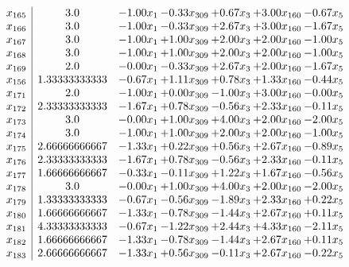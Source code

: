 \documentclass[8pt]{article}
\begin{document}
\[\begin{array}{c| c c@{\hskip 2pt} c@{\hskip 2pt} c@{\hskip 2pt} c@{\hskip 2pt} c@{\hskip 2pt} }
 x_{165}   &  3.0 & -1.00 x_{1} & -0.33 x_{309} & +  0.67 x_{3} & +  3.00 x_{160} & -0.67 x_{5}\\
 x_{166}   &  3.0 & -1.00 x_{1} & -0.33 x_{309} & +  2.67 x_{3} & +  3.00 x_{160} & -1.67 x_{5}\\
 x_{167}   &  3.0 & -1.00 x_{1} & +  1.00 x_{309} & +  2.00 x_{3} & +  2.00 x_{160} & -1.00 x_{5}\\
 x_{168}   &  3.0 & -1.00 x_{1} & +  1.00 x_{309} & +  2.00 x_{3} & +  2.00 x_{160} & -1.00 x_{5}\\
 x_{169}   &  2.0 & -0.00 x_{1} & -0.33 x_{309} & +  2.67 x_{3} & +  2.00 x_{160} & -1.67 x_{5}\\
 x_{156}   &  1.33333333333 & -0.67 x_{1} & +  1.11 x_{309} & +  0.78 x_{3} & +  1.33 x_{160} & -0.44 x_{5}\\
 x_{171}   &  2.0 & -1.00 x_{1} & +  0.00 x_{309} & -1.00 x_{3} & +  3.00 x_{160} & -0.00 x_{5}\\
 x_{172}   &  2.33333333333 & -1.67 x_{1} & +  0.78 x_{309} & -0.56 x_{3} & +  2.33 x_{160} & -0.11 x_{5}\\
 x_{173}   &  3.0 & -0.00 x_{1} & +  1.00 x_{309} & +  4.00 x_{3} & +  2.00 x_{160} & -2.00 x_{5}\\
 x_{174}   &  3.0 & -1.00 x_{1} & +  1.00 x_{309} & +  2.00 x_{3} & +  2.00 x_{160} & -1.00 x_{5}\\
 x_{175}   &  2.66666666667 & -1.33 x_{1} & +  0.22 x_{309} & +  0.56 x_{3} & +  2.67 x_{160} & -0.89 x_{5}\\
 x_{176}   &  2.33333333333 & -1.67 x_{1} & +  0.78 x_{309} & -0.56 x_{3} & +  2.33 x_{160} & -0.11 x_{5}\\
 x_{177}   &  1.66666666667 & -0.33 x_{1} & -0.11 x_{309} & +  1.22 x_{3} & +  1.67 x_{160} & -0.56 x_{5}\\
 x_{178}   &  3.0 & -0.00 x_{1} & +  1.00 x_{309} & +  4.00 x_{3} & +  2.00 x_{160} & -2.00 x_{5}\\
 x_{179}   &  1.33333333333 & -0.67 x_{1} & -0.56 x_{309} & -1.89 x_{3} & +  2.33 x_{160} & +  0.22 x_{5}\\
 x_{180}   &  1.66666666667 & -1.33 x_{1} & -0.78 x_{309} & -1.44 x_{3} & +  2.67 x_{160} & +  0.11 x_{5}\\
 x_{181}   &  4.33333333333 & -0.67 x_{1} & -1.22 x_{309} & +  2.44 x_{3} & +  4.33 x_{160} & -2.11 x_{5}\\
 x_{182}   &  1.66666666667 & -1.33 x_{1} & -0.78 x_{309} & -1.44 x_{3} & +  2.67 x_{160} & +  0.11 x_{5}\\
 x_{183}   &  2.66666666667 & -1.33 x_{1} & +  0.56 x_{309} & -0.11 x_{3} & +  2.67 x_{160} & -0.22 x_{5}\\

\end{array}\]
\end{document}
